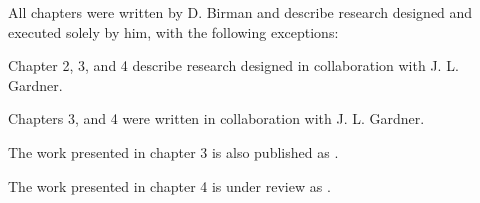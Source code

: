 All chapters were written by D. Birman and describe research designed and executed solely by him, with the following exceptions:

Chapter 2, 3, and 4 describe research designed in collaboration with J. L. Gardner. 

Chapters 3, and 4 were written in collaboration with J. L. Gardner. 

The work presented in chapter 3 is also published as \citet{Birman2018-sp}.

The work presented in chapter 4 is under review as \citet{Birman_undated-vk}.
